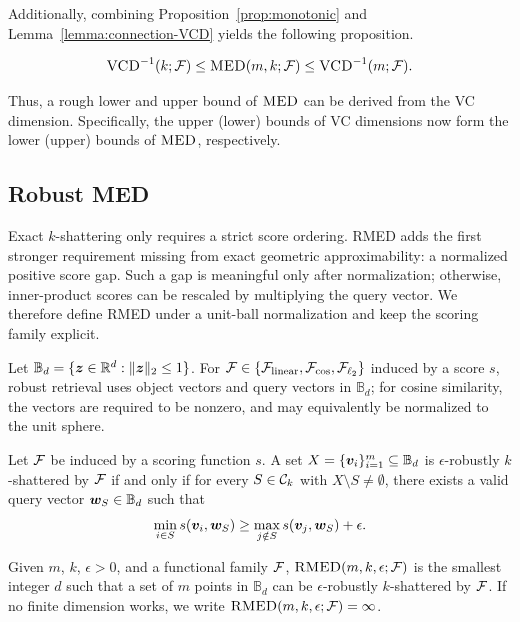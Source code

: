 \documentclass{article}
\begin{document}
Additionally, combining Proposition~\ref{prop:monotonic} and Lemma~\ref{lemma:connection-VCD} yields the following proposition.
\begin{proposition}\label{prop:vc-bounds}
    $$\textsc{VCD}^{-1}(k; \mathcal{F}) \leq \textsc{MED}(m, k; \mathcal{F}) \leq \textsc{VCD}^{-1}(m; \mathcal{F}).$$
\end{proposition}
Thus, a rough lower and upper bound of $\textsc{MED}$ can be derived from the VC dimension. Specifically, the upper (lower) bounds of VC dimensions now form the lower (upper) bounds of $\textsc{MED}$, respectively.

\subsection{Robust MED}\label{sec:rmed-definition}
Exact $k$-shattering only requires a strict score ordering. RMED adds the first stronger requirement missing from exact geometric approximability: a normalized positive score gap. Such a gap is meaningful only after normalization; otherwise, inner-product scores can be rescaled by multiplying the query vector. We therefore define RMED under a unit-ball normalization and keep the scoring family explicit.

Let $\mathbb{B}_d=\{\bm{z}\in\mathbb{R}^d:\|\bm{z}\|_2\leq 1\}$. For $\mathcal{F}\in\{\mathcal{F}_{\rm linear},\mathcal{F}_{\cos},\mathcal{F}_{\ell_{2}}\}$ induced by a score $s$, robust retrieval uses object vectors and query vectors in $\mathbb{B}_d$; for cosine similarity, the vectors are required to be nonzero, and may equivalently be normalized to the unit sphere.

\begin{definition}\label{def:robust-shattering}
    Let $\mathcal{F}$ be induced by a scoring function $s$. A set $X=\{\bm{v}_i\}_{i=1}^m\subseteq \mathbb{B}_d$ is $\epsilon$-robustly $k$-shattered by $\mathcal{F}$ if and only if for every $S\in \mathcal{C}_k$ with $X\setminus S\neq\emptyset$, there exists a valid query vector $\bm{w}_S\in \mathbb{B}_d$ such that
    \begin{align*}
        \min_{i\in S}s(\bm{v}_i,\bm{w}_S)
        \geq
        \max_{j\notin S}s(\bm{v}_j,\bm{w}_S)+\epsilon.
    \end{align*}
\end{definition}

\begin{definition}\label{def:rmed}
    Given $m$, $k$, $\epsilon>0$, and a functional family $\mathcal{F}$, $\textsc{RMED}(m,k,\epsilon;\mathcal{F})$ is the smallest integer $d$ such that a set of $m$ points in $\mathbb{B}_d$ can be $\epsilon$-robustly $k$-shattered by $\mathcal{F}$. If no finite dimension works, we write $\textsc{RMED}(m,k,\epsilon;\mathcal{F})=\infty$.
\end{definition}
\end{document}

